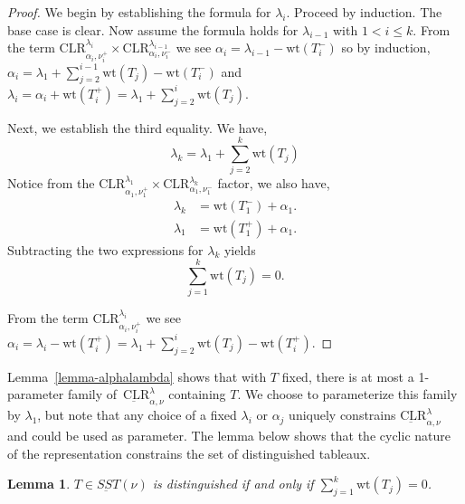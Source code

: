 \documentclass[11pt]{article}
\newtheorem{lemma}[theo]{Lemma}
\theoremstyle{definition}
\numberwithin{equation}{section}
\newcommand{\wt}{\text{wt}}
\newcommand{\CLR}{\text{CLR}}
\begin{document}
\begin{proof}
    We begin by establishing the formula for $\lambda_i$. Proceed by induction. The base case is clear. Now assume the formula holds for $\lambda_{i-1}$ with $1 < i \leq k$. From the term $\CLR^{\lambda_i}_{\alpha_i, \nu_i^+} \times \CLR^{\lambda_{i-1}}_{\alpha_i, \nu_i^-}$ we see $\alpha_i = \lambda_{i-1} - \wt(T_i^-)$ so by induction, $\alpha_i = \lambda_1 + \sum_{j=2}^{i-1}\wt(T_j) - \wt(T_i^-)$ and $\lambda_i = \alpha_i + \wt(T_i^+) = \lambda_1 + \sum_{j=2}^i\wt(T_j)$.

    Next, we establish the third equality. We have, 
    $$\lambda_k = \lambda_1 + \sum_{j=2}^{k} \wt(T_j)$$
    Notice from the $ \CLR^{\lambda_1}_{\alpha_1, \nu_1^+} \times \CLR^{\lambda_{k}}_{\alpha_1, \nu_1^-}$ factor, we also have,
    \begin{align*}
    \lambda_k &= \wt(T_1^-) + \alpha_1.\\
    \lambda_1 &= \wt(T_1^+) + \alpha_1.
    \end{align*}
    Subtracting the two expressions for $\lambda_k$ yields
    $$\sum_{j=1}^k \wt(T_j) = 0.$$
    
    From the term $\CLR^{\lambda_i}_{\alpha_i, \nu_i^+}$ we see $\alpha_i = \lambda_i - \wt(T_i^+) = \lambda_1 + \sum_{j=2}^{i} \wt(T_j) - \wt(T_i^+)$. 
\end{proof}

Lemma~\ref{lemma-alphalambda} shows that with $T$ fixed, there is at most a 1-parameter family of~$\underbar{\CLR}^\lambda_{\alpha, \nu}$ containing $T$. We choose to parameterize this family by $\lambda_1$, but note that any choice of a fixed $\lambda_i$ or $\alpha_j$ uniquely constrains  $\underbar{\CLR}^\lambda_{\alpha, \nu}$ and could be used as parameter. The lemma below shows that the cyclic nature of the representation constrains the set of distinguished tableaux.

\begin{lemma} \label{lemma-distingchar}
    $T \in \underbar{SST}(\nu)$ is distinguished if and only if $\sum_{j=1}^k \wt(T_j) = 0$.
\end{lemma}
\end{document}
